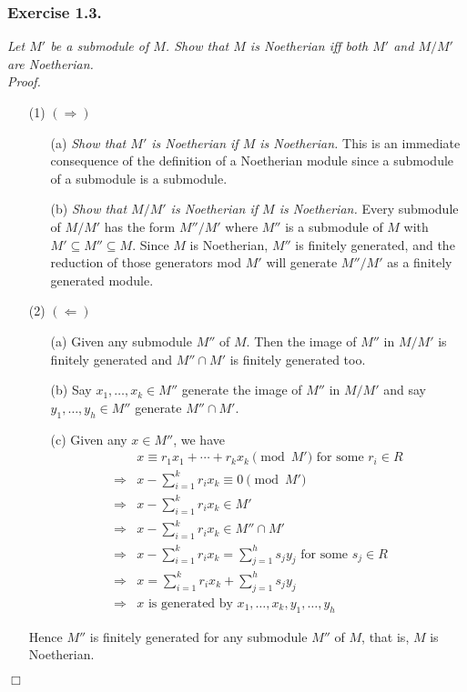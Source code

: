\documentclass{article}
\begin{document}



\subsubsection*{Exercise 1.3.}
\emph{Let $M'$ be a submodule of $M$.
Show that $M$ is Noetherian iff both $M'$ and $M/M'$ are Noetherian.} \\

\emph{Proof.}
\begin{enumerate}
\item[(1)]
$(\Longrightarrow)$
  \begin{enumerate}
  \item[(a)]
  \emph{Show that $M'$ is Noetherian if $M$ is Noetherian.}
  This is an immediate consequence of the definition of a Noetherian module
  since a submodule of a submodule is a submodule.
  \item[(b)]
  \emph{Show that $M/M'$ is Noetherian if $M$ is Noetherian.}
  Every submodule of $M/M'$ has the form $M''/M'$
  where $M''$ is a submodule of $M$ with $M' \subseteq M'' \subseteq M$.
  Since $M$ is Noetherian, $M''$ is finitely generated,
  and the reduction of those generators mod $M'$ will generate $M''/M'$
  as a finitely generated module.
  \end{enumerate}
\item[(2)]
$(\Longleftarrow)$
  \begin{enumerate}
  \item[(a)]
  Given any submodule $M''$ of $M$.
  Then the image of $M''$ in $M/M'$ is finitely generated and
  $M'' \cap M'$ is finitely generated too.
  \item[(b)]
  Say $x_1, \ldots, x_k \in M''$ generate the image of $M''$ in $M/M'$ and
  say $y_1, \ldots, y_h \in M''$ generate $M'' \cap M'$.
  \item[(c)]
  Given any $x \in M''$, we have
  \begin{align*}
  &x \equiv r_1 x_1 + \cdots + r_k x_k \pmod{M'} \text{ for some } r_i \in R \\
  \Longrightarrow&
  x - \sum_{i=1}^{k} r_i x_k \equiv 0 \pmod{M'} \\
  \Longrightarrow&
  x - \sum_{i=1}^{k} r_i x_k \in M' \\
  \Longrightarrow&
  x - \sum_{i=1}^{k} r_i x_k \in M'' \cap M' \\
  \Longrightarrow&
  x - \sum_{i=1}^{k} r_i x_k = \sum_{j=1}^{h} s_j y_j \text{ for some } s_j \in R \\
  \Longrightarrow&
  x = \sum_{i=1}^{k} r_i x_k + \sum_{j=1}^{h} s_j y_j \\
  \Longrightarrow&
  \text{$x$ is generated by $x_1, \ldots, x_k, y_1, \ldots, y_h$}
  \end{align*}
  \end{enumerate}
  Hence $M''$ is finitely generated for any submodule $M''$ of $M$,
  that is, $M$ is Noetherian.
\end{enumerate}
$\Box$ \\\\
\end{document}
